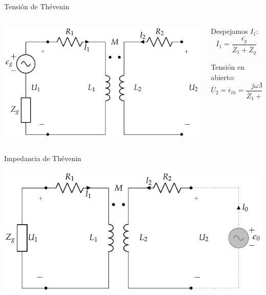 \documentclass[aspectratio=169, usenames,svgnames,dvipsnames]{beamer}
\begin{document}
\begin{frame}[label={sec:org6100e48}]{Tensión de Thévenin}
\begin{columns}
\begin{column}{0.5\columnwidth}
\begin{center}
\includegraphics[height=0.5\textheight]{../figs/Trafo_Real_FuentePrimario.pdf}
\end{center}
\end{column}
\begin{column}{0.5\columnwidth}
Despejamos \(I_1\):
\[
  \overline{I}_1 = \frac{\overline{\epsilon_g}}{\overline{Z}_1 + \overline{Z}_g}
\]

Tensión en abierto:
\[
  \overline{U}_2 = \boxed{\overline{\epsilon}_{th} = \frac{j\omega M}{\overline{Z}_1 + \overline{Z}_g} \cdot \overline{\epsilon}_g}
\]
\end{column}
\end{columns}
\end{frame}
\begin{frame}[label={sec:org397601f}]{Impedancia de Thévenin}
\begin{center}
\includegraphics[width=.9\linewidth]{../figs/Trafo_Real_ImpedanciaPrimario.pdf}
\end{center}
\end{frame}
\end{document}
